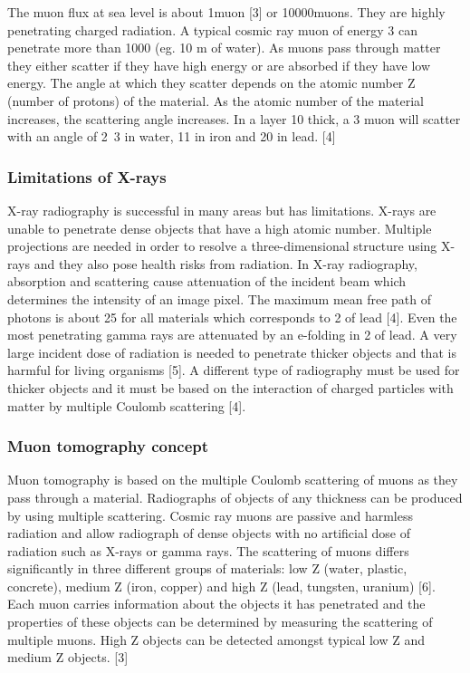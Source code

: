 \documentclass[a4paper]{article}
\begin{document}
The muon flux at sea level is about \unit{1}{muon\usk\rpsquare{\centi\metre}\usk\reciprocal\minute} [3] or 
\unit{10000}{muons\usk\rpsquare\metre\usk\reciprocal\minute}. They are highly penetrating charged radiation. 
A typical cosmic ray muon of energy \unit{3}{\giga\electronvolt} can penetrate more than 
\unit{1000}{\gram\usk\rpsquare{\centi\metre}} (eg. 10 m of water). As muons pass through matter they either
scatter if they have high energy or are absorbed if they have low energy. The angle at which they
scatter depends on the atomic number Z (number of protons) of the material. As the atomic number
of the material increases, the scattering angle increases. In a layer \unit{10}{\centi\metre} thick, a 
\unit{3}{\giga\electronvolt} muon will scatter with an angle of \unit{2.3}{\milli\radian} in water, 
\unit{11}{\milli\radian} in iron and \unit{20}{\milli\radian} in lead. [4]

\subsubsection{Limitations of X-rays}
X-ray radiography is successful in many areas but has limitations. X-rays are unable to penetrate
dense objects that have a high atomic number. Multiple projections are needed in order to resolve a
three-dimensional structure using X-rays and they also pose health risks from radiation. In X-ray
radiography, absorption and scattering cause attenuation of the incident beam which determines
the intensity of an image pixel. The maximum mean free path of photons is about \unit{25}{\gram\usk\rpsquare{\centi\metre}} for all
materials which corresponds to \unit{2}{\centi\metre} of lead [4]. Even the most penetrating gamma rays are
attenuated by an e-folding in \unit{2}{\centi\metre} of lead. A very large incident dose of radiation is needed to
penetrate thicker objects and that is harmful for living organisms [5]. A different type of radiography
must be used for thicker objects and it must be based on the interaction of charged particles with
matter by multiple Coulomb scattering [4].

\subsubsection{Muon tomography concept}
Muon tomography is based on the multiple Coulomb scattering of muons as they pass through a
material. Radiographs of objects of any thickness can be produced by using multiple scattering.
Cosmic ray muons are passive and harmless radiation and allow radiograph of dense objects with no
artificial dose of radiation such as X-rays or gamma rays. The scattering of muons differs significantly
in three different groups of materials: low Z (water, plastic, concrete), medium Z (iron, copper) and
high Z (lead, tungsten, uranium) [6]. Each muon carries information about the objects it has
penetrated and the properties of these objects can be determined by measuring the scattering of
multiple muons. High Z objects can be detected amongst typical low Z and medium Z objects. [3]
\end{document}
